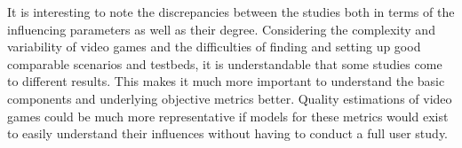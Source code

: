 It is interesting to note the discrepancies between the studies both in terms of the influencing parameters as well as their degree. Considering the complexity and variability of video games and the difficulties of finding and setting up good comparable scenarios and testbeds, it is understandable that some studies come to different results. This makes it much more important to understand the basic components and underlying objective metrics better. Quality estimations of video games could be much more representative if models for these metrics would exist to easily understand their influences without having to conduct a full user study.















